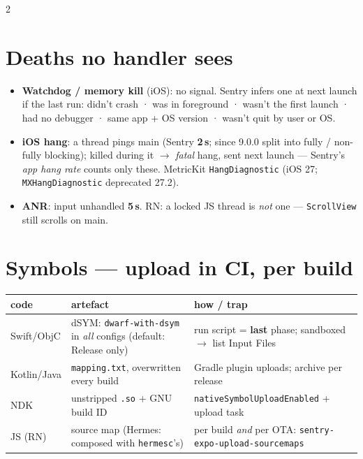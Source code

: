 \documentclass[8pt]{extarticle}
\newcommand\ct[1]{\texttt{#1}}
\begin{document}
\begin{multicols}{2}
\section{Deaths no handler sees}
\begin{itemize}
  \item \textbf{Watchdog / memory kill} (iOS): no signal. Sentry infers one at next launch
        if the last run: didn't crash · was in foreground · wasn't the first launch · had no
        debugger · same app + OS version · wasn't quit by user or OS.
  \item \textbf{iOS hang}: a thread pings main (Sentry \textbf{2\,s}; since 9.0.0 split into fully
        / non-fully blocking); killed during it $\to$ \emph{fatal} hang, sent next launch —
        Sentry's \emph{app hang rate} counts only these.
        MetricKit \ct{HangDiagnostic} (iOS 27; \ct{MXHangDiagnostic} deprecated 27.2).
  \item \textbf{ANR}: input unhandled \textbf{5\,s}. RN: a locked JS thread is \emph{not} one —
        \ct{ScrollView} still scrolls on main.
\end{itemize}

\section{Symbols — upload in CI, per build}
{\footnotesize\setlength{\tabcolsep}{3pt}
\begin{tabular}{@{}>{\raggedright\arraybackslash}p{11mm}>{\raggedright\arraybackslash}p{27mm}>{\raggedright\arraybackslash}p{37mm}@{}}
\toprule
\textbf{code} & \textbf{artefact} & \textbf{how / trap}\\ \midrule
Swift/ObjC & dSYM: \ct{dwarf-with-dsym} in \emph{all} configs (default: Release only) & run script = \textbf{last} phase; sandboxed $\to$ list Input Files\\
Kotlin/Java & \ct{mapping.txt}, overwritten every build & Gradle plugin uploads; archive per release\\
NDK & unstripped \ct{.so} + GNU build ID & \ct{nativeSymbolUploadEnabled} + upload task\\
JS (RN) & source map (Hermes: composed with \ct{hermesc}'s) & per build \emph{and} per OTA: \ct{sentry-expo-upload-sourcemaps}\\
\bottomrule
\end{tabular}}


\end{multicols}
\end{document}

